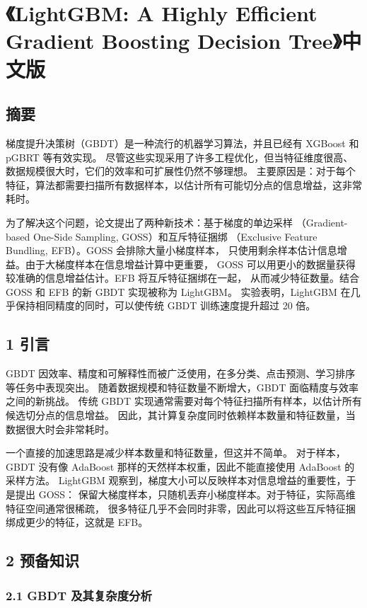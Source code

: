 \chapter{《LightGBM: A Highly Efficient Gradient Boosting Decision Tree》中文版}

\section{摘要}

梯度提升决策树（GBDT）是一种流行的机器学习算法，并且已经有 XGBoost 和 pGBRT 等有效实现。
尽管这些实现采用了许多工程优化，但当特征维度很高、数据规模很大时，它们的效率和可扩展性仍然不够理想。
主要原因是：对于每个特征，算法都需要扫描所有数据样本，以估计所有可能切分点的信息增益，这非常耗时。

为了解决这个问题，论文提出了两种新技术：基于梯度的单边采样
（Gradient-based One-Side Sampling, GOSS）和互斥特征捆绑
（Exclusive Feature Bundling, EFB）。GOSS 会排除大量小梯度样本，
只使用剩余样本估计信息增益。由于大梯度样本在信息增益计算中更重要，
GOSS 可以用更小的数据量获得较准确的信息增益估计。EFB 将互斥特征捆绑在一起，
从而减少特征数量。结合 GOSS 和 EFB 的新 GBDT 实现被称为 LightGBM。
实验表明，LightGBM 在几乎保持相同精度的同时，可以使传统 GBDT 训练速度提升超过 20 倍。

\section{1 引言}

GBDT 因效率、精度和可解释性而被广泛使用，在多分类、点击预测、学习排序等任务中表现突出。
随着数据规模和特征数量不断增大，GBDT 面临精度与效率之间的新挑战。
传统 GBDT 实现通常需要对每个特征扫描所有样本，以估计所有候选切分点的信息增益。
因此，其计算复杂度同时依赖样本数量和特征数量，当数据很大时会非常耗时。

一个直接的加速思路是减少样本数量和特征数量，但这并不简单。
对于样本，GBDT 没有像 AdaBoost 那样的天然样本权重，因此不能直接使用 AdaBoost 的采样方法。
LightGBM 观察到，梯度大小可以反映样本对信息增益的重要性，于是提出 GOSS：
保留大梯度样本，只随机丢弃小梯度样本。对于特征，实际高维特征空间通常很稀疏，
很多特征几乎不会同时非零，因此可以将这些互斥特征捆绑成更少的特征，这就是 EFB。

\section{2 预备知识}

\subsection{2.1 GBDT 及其复杂度分析}


